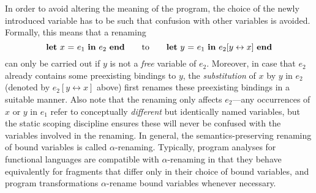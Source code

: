 {In order to avoid altering the meaning of the program, the choice of
the newly introduced variable has to be such that confusion with other
variables is avoided. Formally, this means that a renaming {\small $$\mathbf{let}\ {x}\ \mathbf{=}\ {e_1}\ \mathbf{in}\ {e_2}\ \mathbf{end} \qquad \textrm{\normalsize to} \qquad \mathbf{let}\ {y}\ \mathbf{=}\ {e_1}\ \mathbf{in}\ {e_2[y\leftrightarrow x]}\ \mathbf{end}$$}%
can only be carried out if
$y$ is not a \emph{free} variable of $e_2$. Moreover, in case that
$e_2$ already contains some preexisting bindings to $y$, the
\emph{substitution} of $x$ by $y$ in $e_2$ (denoted by $e_2[y\leftrightarrow x]$
above) first renames these preexisting bindings in a suitable manner.
Also note that the renaming only affects $e_2$---any
occurrences of $x$ or $y$ in $e_1$ refer to conceptually
\emph{different} but identically named variables, but the static
scoping discipline ensures these will never be confused with the
variables involved in the renaming.
%
%
In general, the semantics-preserving renaming of bound variables is
called $\alpha$-renaming. Typically, 
program analyses for functional
languages are compatible with $\alpha$-renaming in that they behave
equivalently for fragments that differ only in their choice of bound
variables, and program transformations $\alpha$-rename bound variables
whenever necessary.

}
